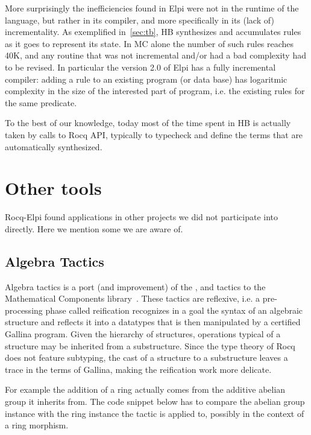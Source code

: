 \documentclass[a4paper, 11pt]{book}
\begin{document}
More surprisingly the inefficiencies found in Elpi were not in the runtime
of the language, but rather in its compiler, and more specifically in
its (lack of) incrementality. As exemplified in~\ref{sec:tb}, HB synthesizes
and accumulates rules as it goes to represent its state. In MC alone
the number of such rules reaches 40K, and any routine that was not incremental
and/or had a bad complexity had to be revised. In particular the version 2.0 of
Elpi has a fully incremental compiler: adding a rule to an existing program (or
data base) has logaritmic complexity in the size of the interested
part of program, i.e. the existing rules for the same predicate.

To the best of our knowledge, today most of the time spent in HB is actually taken
by calls to Rocq API, typically to typecheck and define the terms that are
automatically synthesized.

\section{Other tools}

Rocq-Elpi found applications in other projects we did not participate
into directly. Here we mention some we are aware of.

\subsection{Algebra Tactics}

Algebra tactics is a port (and improvement) of the ,  and
 tactics to the Mathematical Components library~\cite{sakaguchi:LIPIcs.ITP.2022.29}.
These tactics are reflexive, i.e. a pre-processing phase called reification
recognizes in a goal the syntax of an algebraic structure and reflects it into
a datatypes that is then manipulated by a certified Gallina program.
Given the hierarchy of structures, operations typical of a structure may be
inherited from a substructure. Since the type theory of Rocq does not feature
subtyping, the cast of a structure to a substructure leaves a trace in
the terms of Gallina, making the reification work more delicate.

For example the addition of a ring actually comes from the
additive abelian group it inherits from. The code snippet below
has to compare the abelian group instance  with the ring
instance  the tactic is applied to, possibly in the context
 of a ring morphism.
\end{document}

